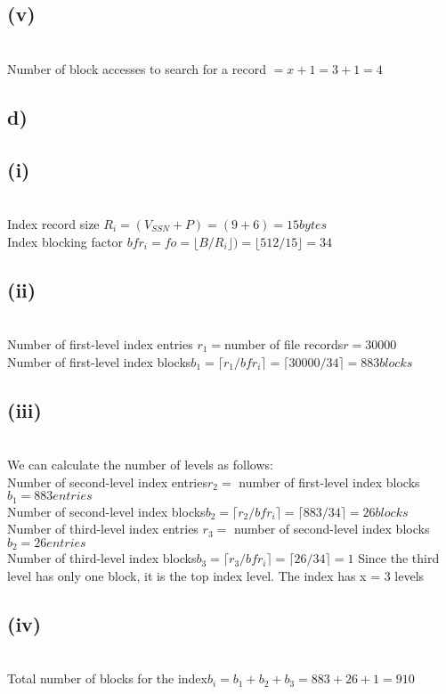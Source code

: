 \documentclass[11pt]{article}
\theoremstyle{plain}
\theoremstyle{definition}
\begin{document}
\subsection*{(v)}\\
Number of block accesses to search for a record $= x + 1 = 3 + 1 = 4$
\subsection*{d)}
\subsection*{(i)}\\
Index record size $R_i = (V_{SSN} + P) = (9 + 6) = 15 bytes$ \\
Index blocking factor $bfr_i= fo = \lfloor B/R_i \rfloor
 ) = \lfloor 512/15 \rfloor = 34 $ \\
\subsection*{(ii)}\\
Number of first-level index entries $r_1 = $number of file records$ r = 30000 $ \\
Number of first-level index blocks$ b_1 = \lceil r_1/bfr_i \rceil = \lceil 30000/34 \rceil = 883 blocks $ \\
\subsection*{(iii)}\\
We can calculate the number of levels as follows: \\
Number of second-level index entries$ r_2=$ number of first-level index blocks $b_1 
= 883 entries $\\
Number of second-level index blocks$ b_2 = \lceil r_2 /bfr_i \rceil = \lceil 883/34 \rceil
= 26 blocks $\\
Number of third-level index entries $r_3 =$ number of second-level index blocks$ b_2
= 26 entries $\\
Number of third-level index blocks$ b_3=\lceil r_3 / bfr_i\rceil = \lceil 26/34\rceil = 1$ 
Since the third level has only one block, it is the top index level. 
The index has x = 3 levels \\
\subsection*{(iv)}\\
Total number of blocks for the index$ b_i = b_1 + b_2 + b_3 = 883 + 26 + 1 = 910 $\\
\end{document}
